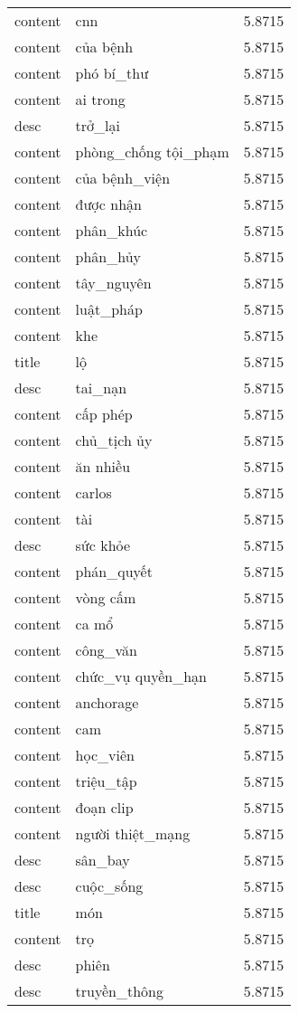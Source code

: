 \documentclass{article}
\begin{document}
\begin{tabular}{lll}
content & cnn & 5.8715\\
content & của bệnh & 5.8715\\
content & phó bí\_thư & 5.8715\\
content & ai trong & 5.8715\\
desc & trở\_lại & 5.8715\\
content & phòng\_chống tội\_phạm & 5.8715\\
content & của bệnh\_viện & 5.8715\\
content & được nhận & 5.8715\\
content & phân\_khúc & 5.8715\\
content & phân\_hủy & 5.8715\\
content & tây\_nguyên & 5.8715\\
content & luật\_pháp & 5.8715\\
content & khe & 5.8715\\
title & lộ & 5.8715\\
desc & tai\_nạn & 5.8715\\
content & cấp phép & 5.8715\\
content & chủ\_tịch ủy & 5.8715\\
content & ăn nhiều & 5.8715\\
content & carlos & 5.8715\\
content & tài & 5.8715\\
desc & sức khỏe & 5.8715\\
content & phán\_quyết & 5.8715\\
content & vòng cấm & 5.8715\\
content & ca mổ & 5.8715\\
content & công\_văn & 5.8715\\
content & chức\_vụ quyền\_hạn & 5.8715\\
content & anchorage & 5.8715\\
content & cam & 5.8715\\
content & học\_viên & 5.8715\\
content & triệu\_tập & 5.8715\\
content & đoạn clip & 5.8715\\
content & người thiệt\_mạng & 5.8715\\
desc & sân\_bay & 5.8715\\
desc & cuộc\_sống & 5.8715\\
title & món & 5.8715\\
content & trọ & 5.8715\\
desc & phiên & 5.8715\\
desc & truyền\_thông & 5.8715\\

\end{tabular}
\end{document}
